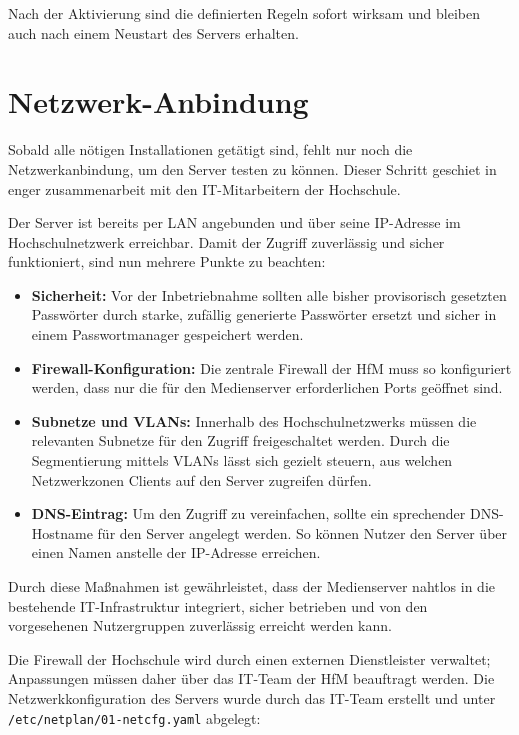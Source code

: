 \documentclass[12pt,a4paper]{report}
\begin{document}
  Nach der Aktivierung sind die definierten Regeln sofort wirksam und bleiben auch nach einem Neustart des Servers erhalten.


\section{Netzwerk-Anbindung}
Sobald alle nötigen Installationen getätigt sind, fehlt nur noch die Netzwerkanbindung, um den Server testen zu können.
Dieser Schritt geschiet in enger zusammenarbeit mit den IT-Mitarbeitern der Hochschule.
  
Der Server ist bereits per \ac{LAN} angebunden und über seine \ac{IP}-Adresse im Hochschulnetzwerk erreichbar. 
Damit der Zugriff zuverlässig und sicher funktioniert, sind nun mehrere Punkte zu beachten:

\begin{itemize}
  \item \textbf{Sicherheit:} Vor der Inbetriebnahme sollten alle bisher provisorisch gesetzten Passwörter durch starke, 
  zufällig generierte Passwörter ersetzt und sicher in einem Passwortmanager gespeichert werden.
  \item \textbf{Firewall-Konfiguration:} Die zentrale Firewall der HfM muss so konfiguriert werden, 
  dass nur die für den Medienserver erforderlichen Ports geöffnet sind.
  \item \textbf{Subnetze und \ac{VLAN}s:} Innerhalb des Hochschulnetzwerks müssen die relevanten Subnetze für den Zugriff freigeschaltet werden. 
        Durch die Segmentierung mittels VLANs lässt sich gezielt steuern, aus welchen Netzwerkzonen Clients auf den Server zugreifen dürfen.
  \item \textbf{\ac{DNS}-Eintrag:} Um den Zugriff zu vereinfachen, sollte ein sprechender DNS-Hostname für den Server angelegt werden. 
        So können Nutzer den Server über einen Namen anstelle der IP-Adresse erreichen.
\end{itemize}

Durch diese Maßnahmen ist gewährleistet, dass der Medienserver nahtlos in die bestehende IT-Infrastruktur integriert, 
sicher betrieben und von den vorgesehenen Nutzergruppen zuverlässig erreicht werden kann.

Die Firewall der Hochschule wird durch einen externen Dienstleister verwaltet; Anpassungen müssen daher über das IT-Team der HfM beauftragt werden. 
Die Netzwerkkonfiguration des Servers wurde durch das IT-Team erstellt und unter \texttt{/etc/netplan/01-netcfg.yaml} abgelegt:
\end{document}
